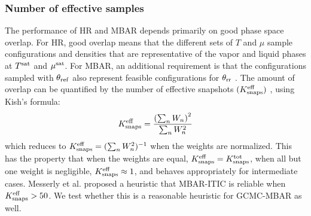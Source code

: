 \documentclass[journal=jced,manuscript=article]{achemso}
\begin{document}

\subsubsection{Number of effective samples} \label{sec: Keff}

The performance of HR and MBAR depends primarily on good phase space overlap. For HR, good overlap means that the different sets of $T$ and $\mu$ sample configurations and densities that are representative of the vapor and liquid phases at $T^{\rm sat}$ and $\mu^{\rm sat}$. For MBAR, an additional requirement is that the configurations sampled with $\theta_{\rm ref}$ also represent feasible configurations for $\theta_{\rm rr}$ \cite{naden:jctc:2016,Postdoc_1}. The amount of overlap can be quantified by the number of effective snapshots $(K^{\rm eff}_{\rm snaps})$ \cite{Dybeck2016}, using Kish's formula:
\begin{eqnarray} \label{Neff_lit}
K^{\rm eff}_{\rm snaps} = \frac{\left(\sum_n W_n\right)^2}{\sum_n W_n^2}
\end{eqnarray}
which reduces to $K^{\rm eff}_{\rm snaps}  = (\sum_n W_n^2)^{-1}$ when the weights are
normalized. This has the property that when the weights are equal,
$K^{\rm eff}_{\rm snaps}  = K^{\rm tot}_{\rm snaps} $, when all but one weight is negligible, $K^{\rm eff}_{\rm snaps}  \approx
1$, and behaves appropriately for intermediate cases. Messerly et al. proposed a heuristic that MBAR-ITIC is reliable when $K^{\rm eff}_{\rm snaps} > 50$. We test whether this is a reasonable heuristic for GCMC-MBAR as well. 
\end{document}
